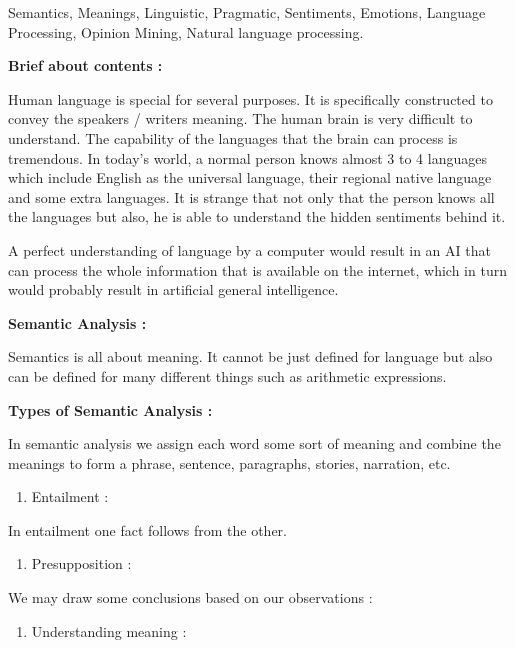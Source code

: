 \documentclass{article} %
\begin{document}
\textbf{ }Semantics, Meanings, Linguistic, Pragmatic, Sentiments, Emotions, Language Processing, Opinion Mining, Natural language processing.

\noindent \textbf{}

\noindent \textbf{Brief about contents :}

Human language is special for several purposes. It is specifically constructed to convey the speakers / writers meaning. The human brain is very difficult to understand. The capability of the languages that the brain can process is tremendous. In today's world, a normal person knows almost 3 to 4 languages which include English as the universal language, their regional native language and some extra languages. It is strange that not only that the person knows all the languages but also, he is able to understand the hidden sentiments behind it.

A perfect understanding of language by a computer would result in an AI that can process the whole information that is available on the internet, which in turn would probably result in artificial general intelligence.

\noindent \textbf{Semantic Analysis : }

Semantics is all about meaning. It cannot be just defined for language but also can be defined for many different things such as arithmetic expressions. 

\noindent \textbf{Types of Semantic Analysis : }

In semantic analysis we assign each word some sort of meaning and combine the meanings to form a phrase, sentence, paragraphs, stories, narration, etc.

\begin{enumerate}
\item  Entailment :
\end{enumerate}

  In entailment one fact follows from the other.

\noindent 

\noindent 

\noindent \eject 

\noindent 

\begin{enumerate}
\item  Presupposition :
\end{enumerate}

We may draw some conclusions based on our observations :

\begin{enumerate}
\item  Understanding meaning :
\end{enumerate}
\end{document}
